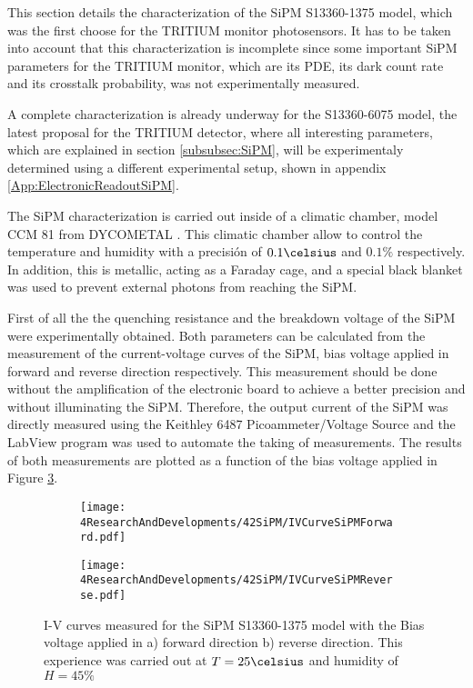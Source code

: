This section details the characterization of the SiPM S13360-1375 model, which was the first choose for the TRITIUM monitor photosensors. It has to be taken into account that this characterization is incomplete since some important SiPM parameters for the TRITIUM monitor, which are its PDE, its dark count rate and its crosstalk probability, was not experimentally measured. 

A complete characterization is already underway for the S13360-6075 model, the latest proposal for the TRITIUM detector, where all interesting parameters, which are explained in section \ref{subsubsec:SiPM}, will be experimentaly determined using a different experimental setup, shown in appendix \ref{App:ElectronicReadoutSiPM}.

The SiPM characterization is carried out inside of a climatic chamber, model CCM 81 from DYCOMETAL \cite{ClimaticChamberIFIMED}. This climatic chamber allow to control the temperature and humidity with a precisión of $0.1\celsius$ and $0.1\%$ respectively. In addition, this is metallic, acting as a Faraday cage, and a special black blanket \cite{BlackBlancket} was used to prevent external photons from reaching the SiPM.

First of all the the quenching resistance and the breakdown voltage of the SiPM were experimentally obtained. Both parameters can be calculated from the measurement of the current-voltage curves of the SiPM, bias voltage applied in forward and reverse direction respectively. This measurement should be done without the amplification of the electronic board to achieve a better precision and without illuminating the SiPM. Therefore, the output current of the SiPM was directly measured using the Keithley 6487 Picoammeter/Voltage Source \cite{DataSheetKeithley6487} and the LabView program was used to automate the taking of measurements. The results of both measurements are plotted as a function of the bias voltage applied in Figure \ref{fig:IVcurveSiPM}.

\begin{figure}
\centering
    \begin{subfigure}[b]{0.9\textwidth}
    \centering
    \texttt{[image: 4ResearchAndDevelopments/42SiPM/IVCurveSiPMForward.pdf]}  
    \caption{\label{subfig:IVcurveForward}}
    \end{subfigure}
    \hfill
    \begin{subfigure}[b]{0.9\textwidth}
    \centering
    \texttt{[image: 4ResearchAndDevelopments/42SiPM/IVCurveSiPMReverse.pdf]}  
    \caption{\label{subfig:IVcurveReverse}}
    \end{subfigure}
 \caption{I-V curves measured for the SiPM S13360-1375 model with the Bias voltage applied in a) forward direction b) reverse direction. This experience was carried out at $T=25\celsius$ and humidity of $H=45\%$}
 \label{fig:IVcurveSiPM}
\end{figure}

